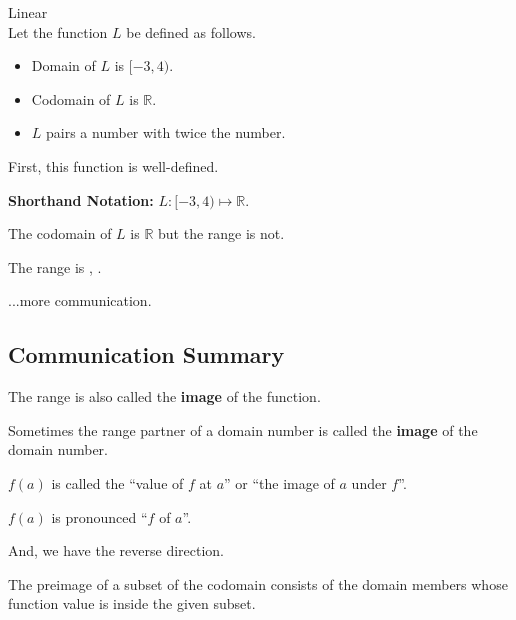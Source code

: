 \documentclass{ximera}
\begin{document}
\begin{example} Linear \\

Let the function $L$ be defined as follows.


\begin{itemize}
\item Domain of $L$ is $[-3, 4)$.
\item Codomain of $L$ is $\mathbb{R}$.
\item $L$ pairs a number with twice the number.
\end{itemize}


First, this function is well-defined. 


\textbf{Shorthand Notation: } $L: [-3, 4) \mapsto \mathbb{R}$.

\begin{question}

The codomain of $L$ is $\mathbb{R}$ but the range is not.  

The range is \wordChoice{\choice[correct]{[}\choice{(}}  ,  \wordChoice{\choice{]}\choice[correct]{)}}.

\end{question}



\end{example}
...more communication. \\






\subsection{Communication Summary}







The range is also called the \textbf{image} of the function.   

Sometimes the range partner of a domain number is called the \textbf{image} of the domain number.

$f(a)$ is called the ``value of $f$ at $a$'' or ``the image of $a$ under $f$''.


$f(a)$ is pronounced ``$f$ of $a$''.


And, we have the reverse direction.

The preimage of a subset of the codomain consists of the domain members whose function value is inside the given subset.
\end{document}
